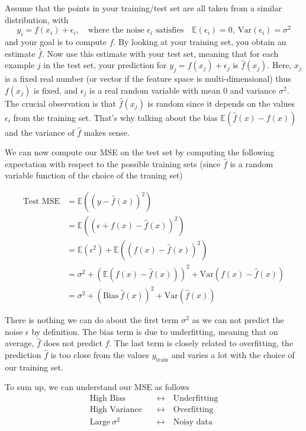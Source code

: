 \documentclass[12pt]{article}
\begin{document}
Assume that the points in your training/test set are all taken from a similar distribution, with
$$y_i = f(x_i) + \epsilon_i, \quad \text{where the noise $\epsilon_i$ satisfies} \quad \mathbb{E}(\epsilon_i) = 0, \ \text{Var}(\epsilon_i) = \sigma^2$$
and your goal is to compute $f$. By looking at your training set, you obtain an estimate $\hat{f}$. Now use this estimate with your test set, meaning that for each example $j$ in the test set, your prediction for $y_j = f(x_j) + \epsilon_j$ is $\hat{f}(x_j)$. Here, $x_j$ is a fixed real number (or vector if the feature space is multi-dimensional) thus $f(x_j)$ is fixed, and $\epsilon_j$ is a real random variable with mean 0 and variance $\sigma^2$. The crucial observation is that $\hat{f}(x_j)$ is random since it depends on the values $\epsilon_i$ from the training set. That's why talking about the bias $\mathbb{E} (\hat{f}(x) - f(x))$ and the variance of $\hat{f}$ makes sense.

We can now compute our MSE on the test set by computing the following expectation with respect to the possible training sets (since $\hat{f}$ is a random variable function of the choice of the traning set)

\begin{align*}
	\text{Test MSE} &=\mathbb{E} \left((y - \hat{f}(x))^2\right) \\
	&= \mathbb{E} \left((\epsilon + f(x) - \hat{f}(x))^2\right) \\
	&= \mathbb{E} (\epsilon^2) + \mathbb{E}\left((f(x)-\hat{f}(x))^2\right) \\
	&= \sigma^2 + \left(\mathbb{E}(f(x)-\hat{f}(x))\right)^2 + \text{Var}\left(f(x)-\hat{f}(x)\right) \\
	&= \sigma^2 + \left(\text{Bias} \ \hat{f}(x)\right)^2 + \text{Var} \left(\hat{f}(x)\right)
\end{align*}

There is nothing we can do about the first term $\sigma^2$ as we can not predict the noise $\epsilon$ by definition. The bias term is due to underfitting, meaning that on average, $\hat{f}$ does not predict $f$. The last term is closely related to overfitting, the prediction $\hat{f}$ is too close from the values $y_{\text{train}}$ and varies a lot with the choice of our training set.

To sum up, we can understand our MSE as follows
\begin{align*}
	\text{High Bias} & \quad \longleftrightarrow \quad \text{Underfitting} \\
	\text{High Variance} & \quad \longleftrightarrow \quad \text{Overfitting} \\
	\text{Large} \ \sigma^2 & \quad \longleftrightarrow \quad \text{Noisy data}
\end{align*}
\end{document}
